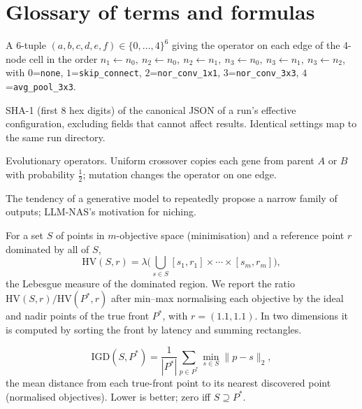 \documentclass[preprint,12pt,authoryear]{elsarticle}
\newcommand{\code}[1]{\texttt{#1}}
\newcommand{\HV}{\mathrm{HV}}
\newcommand{\IGD}{\mathrm{IGD}}
\begin{document}
\section{Glossary of terms and formulas}\label{sec:glossary}
\begin{description}[style=nextline,leftmargin=0pt,itemsep=3pt]

\item[Architecture code (NB201).] A 6-tuple $(a,b,c,d,e,f)\in\{0,\dots,4\}^6$ giving the operator on each edge of the 4-node cell in the order $n_1{\leftarrow}n_0,\ n_2{\leftarrow}n_0,\ n_2{\leftarrow}n_1,\ n_3{\leftarrow}n_0,\ n_3{\leftarrow}n_1,\ n_3{\leftarrow}n_2$, with $0$=\code{none}, $1$=\code{skip\_connect}, $2$=\code{nor\_conv\_1x1}, $3$=\code{nor\_conv\_3x3}, $4$=\code{avg\_pool\_3x3}.

\item[Configuration hash.] SHA-1 (first 8 hex digits) of the canonical JSON of a run's effective configuration, excluding fields that cannot affect results. Identical settings map to the same run directory.

\item[Crossover / mutation.] Evolutionary operators. Uniform crossover copies each gene from parent $A$ or $B$ with probability $\tfrac12$; mutation changes the operator on one edge.

\item[Exploration bias / mode collapse.] The tendency of a generative model to repeatedly propose a narrow family of outputs; LLM-NAS's motivation for niching.

\item[Hypervolume (HV).] For a set $S$ of points in $m$-objective space (minimisation) and a reference point $r$ dominated by all of $S$,
\[
\HV(S,r)=\lambda\Big(\bigcup_{s\in S}[s_1,r_1]\times\cdots\times[s_m,r_m]\Big),
\]
the Lebesgue measure of the dominated region. We report the ratio $\HV(S,r)/\HV(P^\ast,r)$ after min--max normalising each objective by the ideal and nadir points of the true front $P^\ast$, with $r=(1.1,1.1)$. In two dimensions it is computed by sorting the front by latency and summing rectangles.

\item[Inverted generational distance (IGD).]
\[
\IGD(S,P^\ast)=\frac{1}{|P^\ast|}\sum_{p\in P^\ast}\min_{s\in S}\lVert p-s\rVert_2,
\]
the mean distance from each true-front point to its nearest discovered point (normalised objectives). Lower is better; zero iff $S\supseteq P^\ast$.


\end{description}
\end{document}
